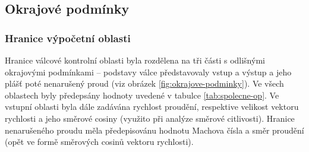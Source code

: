             
     \newpage      
    \subsection{Okrajové podmínky}
        \subsubsection{Hranice výpočetní oblasti}
			Hranice válcové kontrolní oblasti byla rozdělena na tři části s odlišnými okrajovými podmínkami – podstavy válce představovaly vstup a výstup a jeho plášť poté nenarušený proud (viz obrázek \ref{fig:okrajove-podminky}). Ve všech oblastech byly předepsány hodnoty uvedené v tabulce \ref{tab:spolecne-op}. Ve vstupní oblasti byla dále zadávána rychlost proudění, respektive velikost vektoru rychlosti a jeho směrové cosiny (využito při analýze směrové citlivosti). Hranice nenarušeného proudu měla předepisovánu hodnotu Machova čísla a směr proudění (opět ve formě směrových cosinů vektoru rychlosti). 

